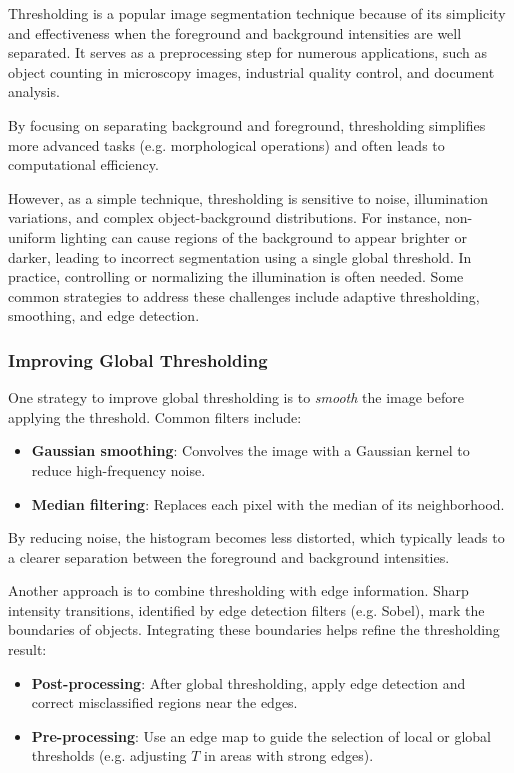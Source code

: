 \documentclass[a4paper,12pt]{article}
\begin{document}
Thresholding is a popular image segmentation technique because of its simplicity and effectiveness when the foreground and background intensities are well separated. It serves as a preprocessing step for numerous applications, such as object counting in microscopy images, industrial quality control, and document analysis.

By focusing on separating background and foreground, thresholding simplifies more advanced tasks (e.g. morphological operations) and often leads to computational efficiency.

However, as a simple technique, thresholding is sensitive to noise, illumination variations, and complex object-background distributions. For instance, non-uniform lighting can cause regions of the background to appear brighter or darker, leading to incorrect segmentation using a single global threshold. In practice, controlling or normalizing the illumination is often needed. Some common strategies to address these challenges include adaptive thresholding, smoothing, and edge detection.

\subsubsection{Improving Global Thresholding}

One strategy to improve global thresholding is to \emph{smooth} the image before applying the threshold. Common filters include:
\begin{itemize}
    \item \textbf{Gaussian smoothing}: Convolves the image with a Gaussian kernel to reduce high-frequency noise.
    \item \textbf{Median filtering}: Replaces each pixel with the median of its neighborhood.
\end{itemize}

By reducing noise, the histogram becomes less distorted, which typically leads to a clearer separation between the foreground and background intensities.

Another approach is to combine thresholding with edge information. Sharp intensity transitions, identified by edge detection filters (e.g. Sobel), mark the boundaries of objects. Integrating these boundaries helps refine the thresholding result:
\begin{itemize}
    \item \textbf{Post-processing}: After global thresholding, apply edge detection and correct misclassified regions near the edges.
    \item \textbf{Pre-processing}: Use an edge map to guide the selection of local or global thresholds (e.g. adjusting \(T\) in areas with strong edges).
\end{itemize}
\end{document}
